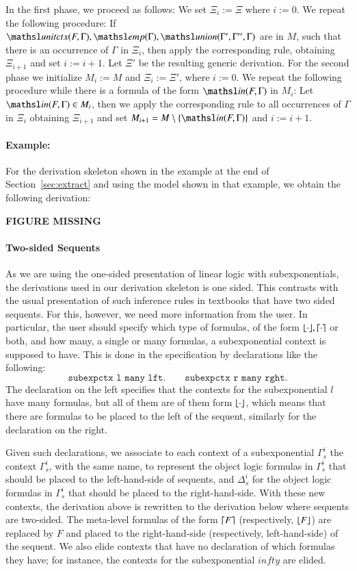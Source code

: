 \documentclass[a4paper,10pt]{article}
\newcommand{\elin}[2]{\ensuremath{{\tsl{unitctx}(\ensuremath{#1}, \ensuremath{#2})}}}
\newcommand{\emp}[1]{\ensuremath{{\tsl{emp}(\ensuremath{#1})}}}
\newcommand{\union}[3]{\ensuremath{{\tsl{union}(\ensuremath{#1},\ensuremath{#2},\ensuremath{ #3})}}}
\newcommand{\In}[2]{\ensuremath{\tsl{in}(\ensuremath{#1},\ensuremath{#2})}}
\begin{document}
In the first phase, we proceed as follows: We set $\Xi_i := \Xi$ where $ i := 0$.
We repeat the following procedure: If 
$\elin{F}{\Gamma}, \emp{\Gamma}, \union{\Gamma'}{\Gamma''}{\Gamma}$ are in $M$, such 
that there is an occurrence of $\Gamma$ in $\Xi_i$, then apply the corresponding 
rule, obtaining $\Xi_{i+1}$ and set $i := i + 1$. 
Let $\Xi'$ be the resulting generic derivation.
For the second phase we initialize $M_i := M$ and $\Xi_i := \Xi'$, where $i := 0$. We repeat 
the following procedure while there is a formula of the form $\In{F}{\Gamma}$ in $M_i$:
Let $\In{F}{\Gamma} \in M_i$, then we apply the corresponding rule to all occurrences of $\Gamma$ in $\Xi_i$
obtaining $\Xi_{i+1}$ and set $M_{i+1} = M \setminus \{\In{F}{\Gamma}\}$  and $i := i + 1$.

\paragraph{Example:}
For the derivation skeleton shown in the example at the end of 
Section~\ref{sec:extract} and using the model shown in that example, we obtain the following derivation:

\textbf{FIGURE MISSING}


\paragraph{Two-sided Sequents}
As we are using the one-sided presentation of linear logic with subexponentials, the derivations used 
in our derivation skeleton is one sided. This contrasts with the usual presentation of such inference
rules in textbooks that have two sided sequents. For this, however, we need more information from the 
user. In particular, the user should specify which type of formulas, of the form $\lfloor \cdot \rfloor, \lceil \cdot \rceil$ or both, 
and how many, a single or many formulas, a subexponential context is supposed to have. 
This is done in the specification by declarations like the following:
\[
 \texttt{subexpctx l many lft.} \qquad
 \texttt{subexpctx r many rght.}
\]
The declaration on the left specifies that the contexts for the subexponential
$l$ have many formulas, but all of them are of them form $\lfloor \cdot \rfloor$, which
means that there are formulas to be placed to the left of the sequent, similarly
for the declaration on the right.

Given such declarations, we associate to each context of a subexponential $\Gamma_s^i$ the context
$\Gamma_s^i$, with the same name, to represent the object logic formulas in $\Gamma_s^i$ that should be 
placed to the left-hand-side of sequents, and $\Delta_s^i$ for the object logic formulas in  $\Gamma_s^i$
that should be placed to the right-hand-side. With these new contexts, the derivation above is rewritten 
to the derivation below where sequents are two-sided. The meta-level formulas of the form $\lceil F \rceil$ (respectively, 
$\lfloor F \rfloor$) are replaced by $F$ and placed to the right-hand-side (respectively, left-hand-side) of the sequent. 
We also elide contexts that have no declaration of which formulas they have; for instance, the contexts for the 
subexponential $infty$ are elided.
\end{document}
